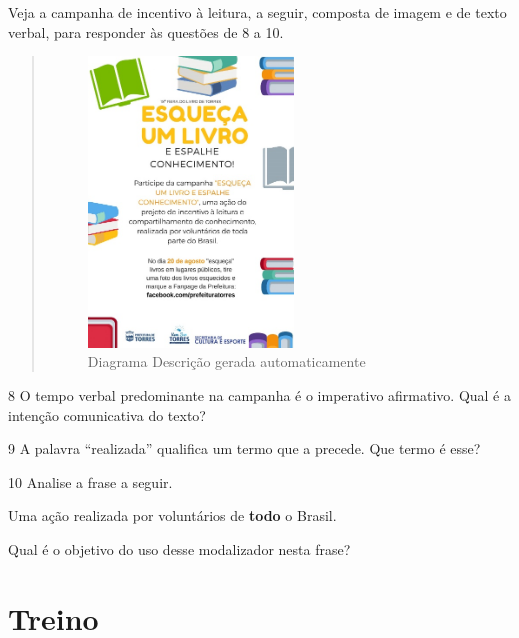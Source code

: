 Veja a campanha de incentivo à leitura, a seguir, composta de imagem e
de texto verbal, para responder às questões de 8 a 10.

\begin{quote}
\begin{figure}[H]
\centering\includegraphics[width=2.14842in,height=3.03846in]{./imgSAEB_6_POR/media/image25.jpeg}
\caption{Diagrama Descrição gerada automaticamente}
\end{figure}

\end{quote}

\num{8} O tempo verbal predominante na campanha é o imperativo
afirmativo. Qual é a intenção comunicativa do texto?


\num{9} A palavra ``realizada'' qualifica um termo que a precede. Que
termo é esse?\EP[1]


\num{10} Analise a frase a seguir.

\begin{myquote}
Uma ação realizada por voluntários de \textbf{{todo}} o Brasil.
\end{myquote}

\noindent Qual é o objetivo do uso desse modalizador nesta frase?


\section*{Treino}

